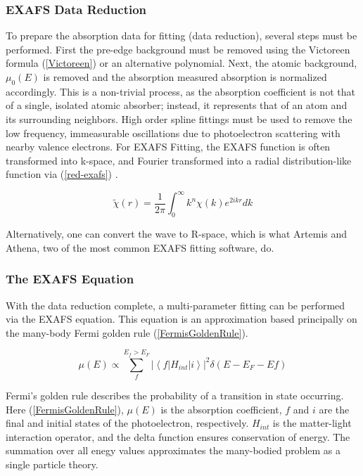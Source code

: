 \subsubsection{EXAFS Data Reduction}
To prepare the absorption data for fitting (data reduction), several steps must be performed. First the pre-edge background must be removed using the Victoreen formula (\ref{Victoreen}) or an alternative polynomial. Next, the atomic background, $ \mu_0(E) $  is removed and the absorption measured absorption is normalized accordingly. This is a non-trivial process, as the absorption coefficient is not that of a single, isolated atomic absorber; instead, it represents that of an atom and its surrounding neighbors. High order spline fittings must be used to remove the low frequency, immeasurable oscillations due to photoelectron scattering with nearby valence electrons. For EXAFS Fitting, the EXAFS function is often transformed into k-space, and Fourier transformed into a radial distribution-like function via (\ref{red-exafs}) \cite{exafsbook}.

\begin{equation}
    \label{rdf-exafs}
    \widetilde{\chi}(r) = \frac{1}{2\pi} \int_{0}^{\infty }  k^n \chi(k) e^{2ikr} dk
\end{equation}

Alternatively, one can convert the wave to R-space, which is what Artemis and Athena, two of the most common EXAFS fitting software, do.

\subsubsection{The EXAFS Equation}
With the data reduction complete, a multi-parameter fitting can be performed via the EXAFS equation. This equation is an approximation based principally on the many-body Fermi golden rule (\ref{FermisGoldenRule}).

\begin{equation}
    \label{FermisGoldenRule}
    \mu(E) \varpropto \sum_{f}^{E_f > E_F} \left\lvert \left\langle f \lvert H_{int} \rvert i \right\rangle \right\rvert ^2 \delta (E - E_F - Ef)  
\end{equation}

\noindent Fermi's golden rule describes the probability of a transition in state occurring. Here (\ref{FermisGoldenRule}), $ \mu(E) $ is the absorption coefficient, $ f $ and $ i $ are the final and initial states of the photoelectron, respectively. $ H_{int} $ is the matter-light interaction operator, and the delta function ensures conservation of energy. The summation over all enegy values approximates the many-bodied problem as a single particle theory. 

